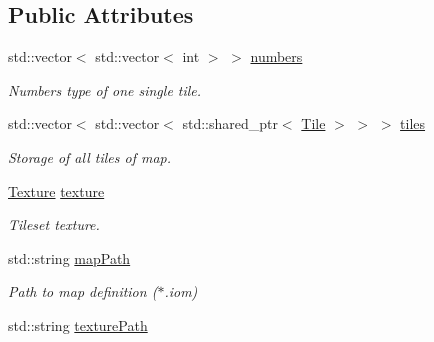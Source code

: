 \subsection*{Public Attributes}
\begin{DoxyCompactItemize}
\item 
\hypertarget{struct_virtual_1_1_map_a80eba30b23a223e38892fb54ac3fd5ae}{}\label{struct_virtual_1_1_map_a80eba30b23a223e38892fb54ac3fd5ae} 
std\+::vector$<$ std\+::vector$<$ int $>$ $>$ \hyperlink{struct_virtual_1_1_map_a80eba30b23a223e38892fb54ac3fd5ae}{numbers}
\begin{DoxyCompactList}\small\item\em Numbers type of one single tile. \end{DoxyCompactList}\item 
\hypertarget{struct_virtual_1_1_map_a008dc98ea15efda9eebdafdde794b26c}{}\label{struct_virtual_1_1_map_a008dc98ea15efda9eebdafdde794b26c} 
std\+::vector$<$ std\+::vector$<$ std\+::shared\+\_\+ptr$<$ \hyperlink{class_virtual_1_1_tile}{Tile} $>$ $>$ $>$ \hyperlink{struct_virtual_1_1_map_a008dc98ea15efda9eebdafdde794b26c}{tiles}
\begin{DoxyCompactList}\small\item\em Storage of all tiles of map. \end{DoxyCompactList}\item 
\hypertarget{struct_virtual_1_1_map_ab20e5047996b454cbbc815be37ac9c6c}{}\label{struct_virtual_1_1_map_ab20e5047996b454cbbc815be37ac9c6c} 
\hyperlink{class_virtual_1_1_texture}{Texture} \hyperlink{struct_virtual_1_1_map_ab20e5047996b454cbbc815be37ac9c6c}{texture}
\begin{DoxyCompactList}\small\item\em Tileset texture. \end{DoxyCompactList}\item 
\hypertarget{struct_virtual_1_1_map_aa03b68bb0d0944fd7ce08cff9e1ff9f6}{}\label{struct_virtual_1_1_map_aa03b68bb0d0944fd7ce08cff9e1ff9f6} 
std\+::string \hyperlink{struct_virtual_1_1_map_aa03b68bb0d0944fd7ce08cff9e1ff9f6}{map\+Path}
\begin{DoxyCompactList}\small\item\em Path to map definition ($\ast$.iom) \end{DoxyCompactList}\item 
\hypertarget{struct_virtual_1_1_map_a89d67a1e3ae34917ed85a4d73e297987}{}\label{struct_virtual_1_1_map_a89d67a1e3ae34917ed85a4d73e297987} 
std\+::string \hyperlink{struct_virtual_1_1_map_a89d67a1e3ae34917ed85a4d73e297987}{texture\+Path}

\end{DoxyCompactItemize}
